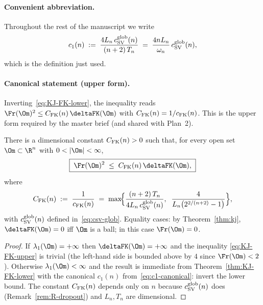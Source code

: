 \paragraph{Convenient abbreviation.} Throughout the rest of the
manuscript we write
\begin{equation}\label{eq:c1-canonical}
c_1(n) \;:=\; \frac{4 L_n\,c_{\rm SV}^{\rm glob}(n)}{(n+2)\,T_n}
\;=\; \frac{4 n L_n}{\omega_n}\,c_{\rm SV}^{\rm glob}(n),
\end{equation}
which is the definition just used.

\paragraph{Canonical statement (upper form).}
Inverting~\eqref{eq:KJ-FK-lower}, the inequality reads
$\Fr(\Om)^2\le C_{\rm FK}(n)\,\deltaFK(\Om)$ with
$C_{\rm FK}(n)=1/c_{\rm FK}(n)$. This is the upper form required by
the master brief (and shared with Plan~2).

\begin{theorem}
\label{thm:KJ-FK-upper}
There is a dimensional constant $C_{\rm FK}(n)>0$ such that, for every
open set $\Om\subset\R^n$ with $0<|\Om|<\infty$,
\begin{equation}\label{eq:KJ-FK-upper}
\boxed{\;
\Fr(\Om)^2 \;\le\; C_{\rm FK}(n)\,\deltaFK(\Om),
\;}
\end{equation}
where
\begin{equation}\label{eq:CFK}
C_{\rm FK}(n)
\;:=\; \frac{1}{c_{\rm FK}(n)}
\;=\; \max\!\Bigl\{
\frac{(n+2)\,T_n}{4 L_n\,c_{\rm SV}^{\rm glob}(n)},\;\;
\frac{4}{L_n\bigl(2^{2/(n+2)}-1\bigr)}
\Bigr\},
\end{equation}
with $c_{\rm SV}^{\rm glob}(n)$ defined in~\eqref{eq:csv-glob}.
Equality cases: by Theorem~\ref{thm:kj}, $\deltaFK(\Om)=0$
iff $\Om$ is a ball; in this case $\Fr(\Om)=0$.
\end{theorem}

\begin{proof}
If $\lambda_1(\Om)=+\infty$ then $\deltaFK(\Om)=+\infty$ and the
inequality \eqref{eq:KJ-FK-upper} is trivial (the left-hand side is
bounded above by $4$ since $\Fr(\Om)<2$). Otherwise
$\lambda_1(\Om)<\infty$ and the result is immediate from
Theorem~\ref{thm:KJ-FK-lower} with the canonical $c_1(n)$
from~\eqref{eq:c1-canonical}: invert the lower bound. The
constant $C_{\rm FK}(n)$ depends only on $n$ because
$c_{\rm SV}^{\rm glob}(n)$ does (Remark~\ref{rem:R-dropout}) and $L_n,
T_n$ are dimensional.
\end{proof}

